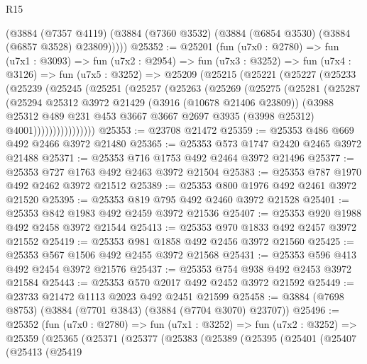 \begin{lexlean}{R15}
\begin{coremodule}
      (@3884
        (@7357 @4119)
        (@3884 (@7360 @3532) (@3884 (@6854 @3530) (@3884 (@6857 @3528) @23809)))))
@25352 := @25201
    (fun (u7x0 : @2780) =>
    fun (u7x1 : @3093) =>
    fun (u7x2 : @2954) =>
    fun (u7x3 : @3252) =>
    fun (u7x4 : @3126) =>
    fun (u7x5 : @3252) =>
    @25209
      (@25215
        (@25221
          (@25227
            (@25233
              (@25239
                (@25245
                  (@25251
                    (@25257
                      (@25263
                        (@25269
                          (@25275
                            (@25281
                              (@25287
                                (@25294
                                  @25312
                                  @3972
                                  @21429
                                  (@3916 (@10678 @21406 @23809))
                                  (@3988
                                    @25312
                                    @489
                                    @231
                                    @453
                                    @3667
                                    @3667
                                    @2697
                                    @3935
                                    (@3998 @25312)
                                    @4001))))))))))))))))
@25353 := @23708 @21472
@25359 := @25353 @486 @669 @492 @2466 @3972 @21480
@25365 := @25353 @573 @1747 @2420 @2465 @3972 @21488
@25371 := @25353 @716 @1753 @492 @2464 @3972 @21496
@25377 := @25353 @727 @1763 @492 @2463 @3972 @21504
@25383 := @25353 @787 @1970 @492 @2462 @3972 @21512
@25389 := @25353 @800 @1976 @492 @2461 @3972 @21520
@25395 := @25353 @819 @795 @492 @2460 @3972 @21528
@25401 := @25353 @842 @1983 @492 @2459 @3972 @21536
@25407 := @25353 @920 @1988 @492 @2458 @3972 @21544
@25413 := @25353 @970 @1833 @492 @2457 @3972 @21552
@25419 := @25353 @981 @1858 @492 @2456 @3972 @21560
@25425 := @25353 @567 @1506 @492 @2455 @3972 @21568
@25431 := @25353 @596 @413 @492 @2454 @3972 @21576
@25437 := @25353 @754 @938 @492 @2453 @3972 @21584
@25443 := @25353 @570 @2017 @492 @2452 @3972 @21592
@25449 := @23733 @21472 @1113 @2023 @492 @2451 @21599
@25458 := @3884 (@7698 @8753) (@3884 (@7701 @3843) (@3884 (@7704 @3070) @23707))
@25496 := @25352
    (fun (u7x0 : @2780) =>
    fun (u7x1 : @3252) =>
    fun (u7x2 : @3252) =>
    @25359
      (@25365
        (@25371
          (@25377
            (@25383
              (@25389
                (@25395
                  (@25401
                    (@25407
                      (@25413
                        (@25419

\end{coremodule}
\end{lexlean}
